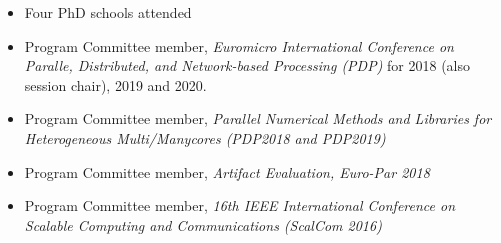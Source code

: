 \documentclass[10pt,a4paper]{altacv}
\begin{document}
\begin{itemize}
\item Four PhD schools attended
\item Program Committee member, \textit{Euromicro International Conference on Paralle, Distributed, and Network-based Processing (PDP)} for 2018 (also session chair), 2019 and 2020.
\item Program Committee member, \textit{Parallel Numerical Methods and Libraries for Heterogeneous Multi/Manycores (PDP2018 and PDP2019)}
\item Program Committee member, \textit{Artifact Evaluation, Euro-Par 2018}
\item Program Committee member, \textit{16th IEEE International Conference on Scalable Computing and Communications (ScalCom 2016)}
\end{itemize}
\end{document}
